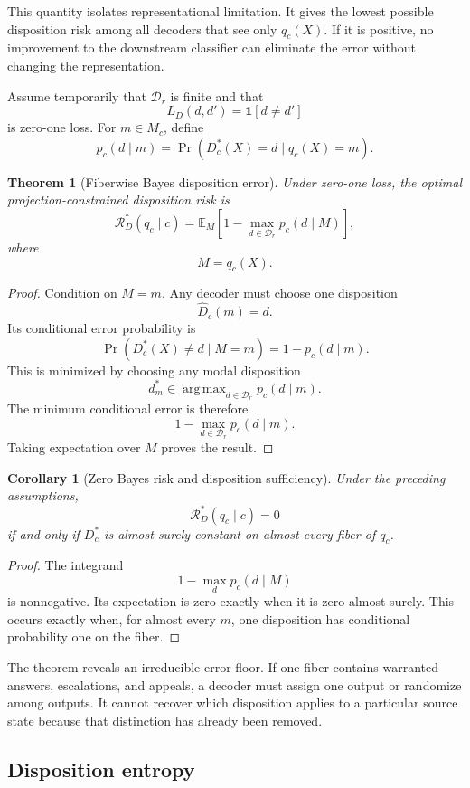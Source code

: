 \documentclass[11pt]{article}
\newtheorem{theorem}[definition]{Theorem}
\newtheorem{corollary}[definition]{Corollary}
\theoremstyle{definition}
\DeclareMathOperator{\argmax}{arg\,max}
\DeclareMathOperator{\Prob}{Pr}
\newcommand{\E}{\mathbb{E}}
\newcommand{\ind}{\mathbf{1}}
\begin{document}
This quantity isolates representational limitation. It gives the lowest possible disposition risk among all decoders that see only \(q_c(X)\). If it is positive, no improvement to the downstream classifier can eliminate the error without changing the representation.

Assume temporarily that \(\mathcal D_r\) is finite and that
\[
L_D(d,d')
=
\ind[d\neq d']
\]
is zero-one loss. For \(m\in M_c\), define
\[
p_c(d\mid m)
=
\Prob(D_c^{*}(X)=d\mid q_c(X)=m).
\]

\begin{theorem}[Fiberwise Bayes disposition error]
Under zero-one loss, the optimal projection-constrained disposition risk is
\[
\mathcal R_D^{*}(q_c\mid c)
=
\E_{M}
\left[
1-
\max_{d\in\mathcal D_r}
p_c(d\mid M)
\right],
\]
where
\[
M=q_c(X).
\]
\end{theorem}

\begin{proof}
Condition on \(M=m\). Any decoder must choose one disposition
\[
\widehat D_c(m)=d.
\]
Its conditional error probability is
\[
\Prob(D_c^{*}(X)\neq d\mid M=m)
=
1-p_c(d\mid m).
\]
This is minimized by choosing any modal disposition
\[
d_m^{*}
\in
\argmax_{d\in\mathcal D_r}
p_c(d\mid m).
\]
The minimum conditional error is therefore
\[
1-
\max_{d\in\mathcal D_r}
p_c(d\mid m).
\]
Taking expectation over \(M\) proves the result.
\end{proof}

\begin{corollary}[Zero Bayes risk and disposition sufficiency]
Under the preceding assumptions,
\[
\mathcal R_D^{*}(q_c\mid c)=0
\]
if and only if \(D_c^{*}\) is almost surely constant on almost every fiber of \(q_c\).
\end{corollary}

\begin{proof}
The integrand
\[
1-\max_d p_c(d\mid M)
\]
is nonnegative. Its expectation is zero exactly when it is zero almost surely. This occurs exactly when, for almost every \(m\), one disposition has conditional probability one on the fiber.
\end{proof}

The theorem reveals an irreducible error floor. If one fiber contains warranted answers, escalations, and appeals, a decoder must assign one output or randomize among outputs. It cannot recover which disposition applies to a particular source state because that distinction has already been removed.

\subsection{Disposition entropy}
\end{document}
